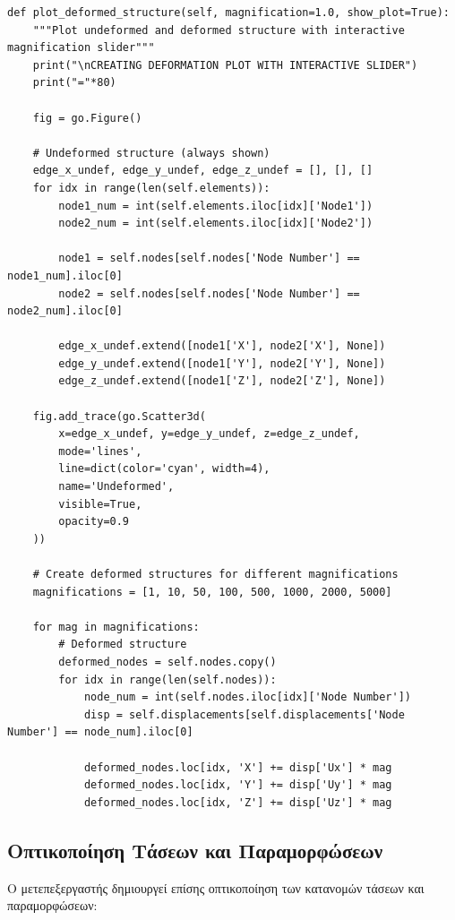 \documentclass[12pt,a4paper]{article}
\begin{document}
\begin{lstlisting}[caption={Γράφημα Παραμορφωμένης Κατασκευής με Slider (Μερικό)}]
def plot_deformed_structure(self, magnification=1.0, show_plot=True):
    """Plot undeformed and deformed structure with interactive magnification slider"""
    print("\nCREATING DEFORMATION PLOT WITH INTERACTIVE SLIDER")
    print("="*80)
    
    fig = go.Figure()
    
    # Undeformed structure (always shown)
    edge_x_undef, edge_y_undef, edge_z_undef = [], [], []
    for idx in range(len(self.elements)):
        node1_num = int(self.elements.iloc[idx]['Node1'])
        node2_num = int(self.elements.iloc[idx]['Node2'])
        
        node1 = self.nodes[self.nodes['Node Number'] == node1_num].iloc[0]
        node2 = self.nodes[self.nodes['Node Number'] == node2_num].iloc[0]
        
        edge_x_undef.extend([node1['X'], node2['X'], None])
        edge_y_undef.extend([node1['Y'], node2['Y'], None])
        edge_z_undef.extend([node1['Z'], node2['Z'], None])
    
    fig.add_trace(go.Scatter3d(
        x=edge_x_undef, y=edge_y_undef, z=edge_z_undef,
        mode='lines',
        line=dict(color='cyan', width=4),
        name='Undeformed',
        visible=True,
        opacity=0.9
    ))
    
    # Create deformed structures for different magnifications
    magnifications = [1, 10, 50, 100, 500, 1000, 2000, 5000]
    
    for mag in magnifications:
        # Deformed structure
        deformed_nodes = self.nodes.copy()
        for idx in range(len(self.nodes)):
            node_num = int(self.nodes.iloc[idx]['Node Number'])
            disp = self.displacements[self.displacements['Node Number'] == node_num].iloc[0]
            
            deformed_nodes.loc[idx, 'X'] += disp['Ux'] * mag
            deformed_nodes.loc[idx, 'Y'] += disp['Uy'] * mag
            deformed_nodes.loc[idx, 'Z'] += disp['Uz'] * mag
\end{lstlisting}

\subsection{Οπτικοποίηση Τάσεων και Παραμορφώσεων}

Ο μετεπεξεργαστής δημιουργεί επίσης οπτικοποίηση των κατανομών τάσεων και παραμορφώσεων:
\end{document}
